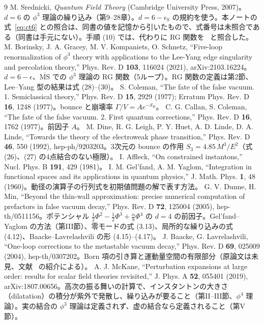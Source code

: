 \documentclass[a4paper,10pt]{ltjsarticle}
\begin{document}
\begin{thebibliography}{9}
\small
{} M. Srednicki, \textit{Quantum Field Theory} (Cambridge University Press, 2007)。$d=6$ の $\phi^3$ 理論の繰り込み（第9--28章）。$d=6-\epsilon_{\mathrm S}$ の規約を使う。本ノートの式~\eqref{eq:ct6} との照合は、同書の値を記憶から引いたもので、式番号は未照合である（同書は手元にない）。手順 (10) では、代わりに RG 関数を~\cite{bgks} と照合した。
 M. Borinsky, J. A. Gracey, M. V. Kompaniets, O. Schnetz, ``Five-loop renormalization of $\phi^3$ theory with applications to the Lee-Yang edge singularity and percolation theory,'' Phys. Rev. D \textbf{103}, 116024 (2021), arXiv:2103.16224。$d=6-\epsilon$、$\overline{\mathrm{MS}}$ での $\phi^3$ 理論の RG 関数（5ループ）。RG 関数の定義は第2節、Lee--Yang 型の結果は式 (28)--(30)。
 S. Coleman, ``The fate of the false vacuum. 1. Semiclassical theory,'' Phys. Rev. D \textbf{15}, 2929 (1977); Erratum Phys. Rev. D \textbf{16}, 1248 (1977)。bounce と崩壊率 $\Gamma/V=Ae^{-S_B}$。
 C. G. Callan, S. Coleman, ``The fate of the false vacuum. 2. First quantum corrections,'' Phys. Rev. D \textbf{16}, 1762 (1977)。前因子 $A$。
 M. Dine, R. G. Leigh, P. Y. Huet, A. D. Linde, D. A. Linde, ``Towards the theory of the electroweak phase transition,'' Phys. Rev. D \textbf{46}, 550 (1992), hep-ph/9203203。3次元の bounce の作用 $S_3=4.85\,M^3/E^2$（式 (26)、(27) の4点結合のない極限）。
 I. Affleck, ``On constrained instantons,'' Nucl. Phys. B \textbf{191}, 429 (1981)。
 I. M. Gel'fand, A. M. Yaglom, ``Integration in functional spaces and its applications in quantum physics,'' J. Math. Phys. \textbf{1}, 48 (1960)。動径の演算子の行列式を初期値問題の解で表す方法。
 G. V. Dunne, H. Min, ``Beyond the thin-wall approximation: precise numerical computation of prefactors in false vacuum decay,'' Phys. Rev. D \textbf{72}, 125004 (2005), hep-th/0511156。ポテンシャル $\frac12\Phi^2-\frac12\Phi^3+\frac\alpha8\Phi^4$ の $d=4$ の前因子。Gel'fand--Yaglom の方法（第III節）、零モードの式 (3.13)、局所的な繰り込みの式 (4.12)、Baacke--Lavrelashvili の形 (4.15)--(4.17)。
 J. Baacke, G. Lavrelashvili, ``One-loop corrections to the metastable vacuum decay,'' Phys. Rev. D \textbf{69}, 025009 (2004), hep-th/0307202。Born 項の引き算と運動量空間の有限部分（原論文は未見、文献~\cite{dunnemin} の紹介による）。
 A. J. McKane, ``Perturbation expansions at large order: results for scalar field theories revisited,'' J. Phys. A \textbf{52}, 055401 (2019), arXiv:1807.00656。高次の振る舞いの計算で、インスタントンの大きさ（dilatation）の積分が紫外で発散し、繰り込みが要ること（第II--III節、$\phi^4$ 理論）。実の結合の $\phi^3$ 理論は定義されず、虚の結合なら定義されること（第V節）。

\end{thebibliography}
\end{document}
